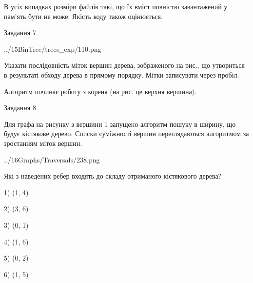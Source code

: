 \documentclass[12pt, ukrainian]{article}
\begin{document}
{В усіх випадках розміри файлів такі, що їх вміст повністю завантажений у пам'ять бути не може. Якість коду також оцінюється.



\vspace{10mm}\par

\newpage
\begin{minipage}[t]{9.7cm}
               
{\begin{center}Завдання {7}\end{center}}
\vspace{-4mm}

\begin{center}
	{../15BinTree/trees_exp/110.png}
\end{center}
Указати послідовність міток вершин дерева, зображеного на рис., що утвориться в результаті обходу дерева в прямому порядку. Мітки записувати через пробіл.\par Алгоритм починає роботу з кореня (на рис. це верхня вершина).\par

\end{minipage}
\vline \hspace{8mm}
\begin{minipage}[t]{8.0cm}
               
{\begin{center}Завдання {8}\end{center}}
\vspace{-4mm}
Для графа на рисунку з вершини 1 запущено алгоритм пошуку в ширину, що будує кістякове дерево. Списки суміжності вершин переглядаються алгоритмом за зростанням міток вершин.\par
\begin{center}
	{../16Graphs/Traversals/238.png}
\end{center}
\par Які з наведених ребер входять до складу отриманого кістякового дерева?\par
1) (1, 4)\par
2) (3, 6)\par
3) (0, 1)\par
4) (1, 6)\par
5) (0, 2)\par
6) (1, 5)\par
{\vskip 15pt} \par


\end{minipage}}
\end{document}
